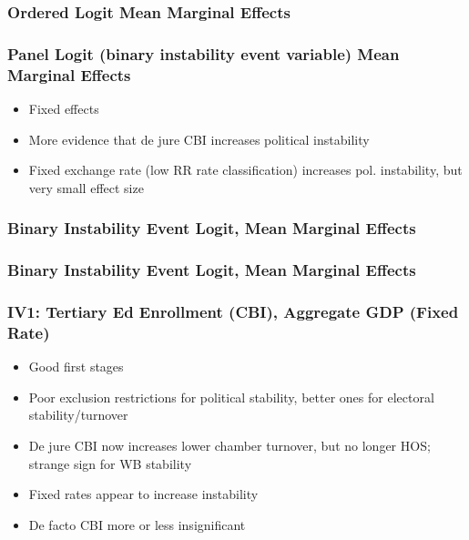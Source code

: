\documentclass{beamer}
\begin{document}
    \begin{frame}
        \frametitle{Ordered Logit Mean Marginal Effects}
        {
            \let\oldcentering\centering
            \renewcommand\centering{\tiny\oldcentering}
            
        }
    \end{frame}

    \begin{frame}
        \frametitle{Panel Logit (binary instability event variable) Mean Marginal Effects}
        \begin{itemize}
            \item Fixed effects
            \item More evidence that de jure CBI increases political instability
            \item Fixed exchange rate (low RR rate classification) increases pol. instability, but very small effect size
        \end{itemize}
    \end{frame}

    \begin{frame}
        \frametitle{Binary Instability Event Logit, Mean Marginal Effects}
        {
            \let\oldcentering\centering
            \renewcommand\centering{\tiny\oldcentering}
            
        }
    \end{frame}

    \begin{frame}
        \frametitle{Binary Instability Event Logit, Mean Marginal Effects}
        {
            \let\oldcentering\centering
            \renewcommand\centering{\tiny\oldcentering}
            
        }
    \end{frame}

    \begin{frame}
        \frametitle{IV1: Tertiary Ed Enrollment (CBI), Aggregate GDP (Fixed Rate)}
        \begin{itemize}
            \item Good first stages
            \item Poor exclusion restrictions for political stability, better ones for electoral stability/turnover
            \item De jure CBI now increases lower chamber turnover, but no longer HOS; strange sign for WB stability
            \item Fixed rates appear to increase instability
            \item De facto CBI more or less insignificant
        \end{itemize}
    \end{frame}
\end{document}
